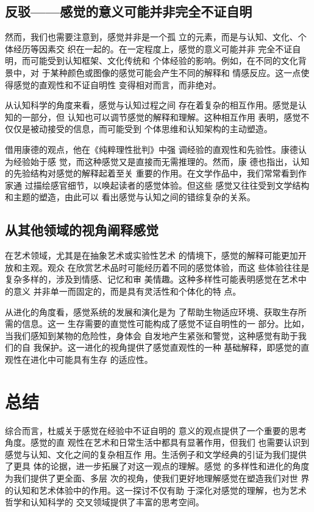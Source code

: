 \documentclass[10pt,a4paper]{beamer} %
\begin{document}
		\subsection{反驳——感觉的意义可能并非完全不证自明}
		\begin{frame}
			\quad\quad 然而，我们也需要注意到，感觉并非是一个孤
			立的元素，而是与认知、文化、个体经历等因素交
			织在一起的。在一定程度上，感觉的意义可能并非
			完全不证自明，而可能受到认知框架、文化传统和
			个体经验的影响。例如，在不同的文化背景中，对
			于某种颜色或图像的感觉可能会产生不同的解释和
			情感反应。这一点使得感觉的直观性和不证自明性
			变得相对而言，而非绝对。
		
			\quad\quad 从认知科学的角度来看，感觉与认知过程之间
			存在着复杂的相互作用。感觉是认知的一部分，但
			认知也可以调节感觉的解释和理解。这种相互作用
			表明，感觉不仅仅是被动接受的信息，而可能受到
			个体思维和认知架构的主动塑造。
		
			\quad\quad 借用康德的观点，他在《纯粹理性批判》中强
			调经验的直观性和先验性。康德认为经验始于感
			觉，而这种感觉又是直接而无需推理的。然而，康
			德也指出，认知的先验结构对感觉的解释起着至关
			重要的作用。在文学作品中，我们常常看到作家通
			过描绘感官细节，以唤起读者的感觉体验。但这些
			感觉又往往受到文学结构和主题的塑造，由此可以
			看出感觉与认知之间的错综复杂的关系。
		\end{frame}
		\subsection{从其他领域的视角阐释感觉}
		\begin{frame}
			\quad\quad 在艺术领域，尤其是在抽象艺术或实验性艺术
			的情境下，感觉的解释可能更加开放和主观。观众
			在欣赏艺术品时可能经历着不同的感觉体验，而这
			些体验往往是复杂多样的，涉及到情感、记忆和审
			美情趣。这种多样性可能表明感觉在艺术中的意义
			并非单一而固定的，而是具有灵活性和个体化的特
			点。
		
			\quad\quad 从进化的角度看，感觉系统的发展和演化是为
			了帮助生物适应环境、获取生存所需的信息。这一
			生存需要的直觉性可能构成了感觉不证自明性的一
			部分。比如，当我们感知到某物的危险性，身体会
			自发地产生紧张和警觉，这种感觉有助于我们的自
			我保护。这一进化的视角提供了感觉直观性的一种
			基础解释，即感觉的直观性在进化中可能具有生存
			的适应性。
		\end{frame}
	\section{总结}
	\begin{frame}
		\quad\quad 综合而言，杜威关于感觉在经验中不证自明的
		意义的观点提供了一个重要的思考角度。感觉的直
		观性在艺术和日常生活中都具有显著作用，但我们
		也需要认识到感觉与认知、文化之间的复杂相互作
		用。生活例子和文学经典的引证为我们提供了更具
		体的论据，进一步拓展了对这一观点的理解。感觉
		的多样性和进化的角度为我们提供了更全面、多层
		次的视角，使我们更好地理解感觉在塑造我们对世
		界的认知和艺术体验中的作用。这一探讨不仅有助
		于深化对感觉的理解，也为艺术哲学和认知科学的
		交叉领域提供了丰富的思考空间。
	\end{frame}
	
\end{document}

